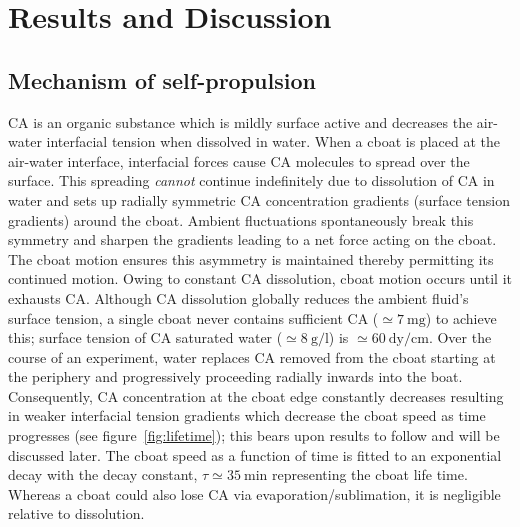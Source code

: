 \documentclass[journal=langd5, manuscript=article, layout=twocolumn]{achemso}
\begin{document}
\section{Results and Discussion}
\subsection{Mechanism of self-propulsion}
\label{sec:propmech}
CA is an organic substance which is mildly surface active and decreases the air-water interfacial tension when dissolved in water. When a cboat is placed at the air-water interface, interfacial forces cause CA molecules to spread over the surface. This spreading \emph{cannot} continue indefinitely due to dissolution of CA in water and sets up radially symmetric CA concentration gradients (surface tension gradients) around the cboat. Ambient fluctuations spontaneously break this symmetry and sharpen the gradients leading to a net force acting on the cboat. The cboat motion ensures this asymmetry is maintained thereby permitting its continued motion. %
Owing to constant CA dissolution, cboat motion occurs until it exhausts CA. Although CA dissolution globally reduces the ambient fluid's surface tension, a single cboat never contains sufficient CA ($\simeq 7\ \mathrm{mg}$) to achieve this; surface tension of CA saturated water ($\simeq 8\ \mathrm{g/l}$) is $\simeq 60\ \mathrm{dy/cm}$. Over the course of an experiment, water replaces CA removed from the cboat starting at the periphery and progressively proceeding radially inwards into the boat. Consequently, CA concentration at the cboat edge constantly decreases resulting in weaker interfacial tension gradients which decrease the cboat speed as time progresses (see figure~\ref{fig:lifetime}); this bears upon results to follow and will be discussed later. The cboat speed as a function of time is fitted to an exponential decay with the decay constant, $\tau \simeq 35\ \mathrm{min}$ representing the cboat life time. Whereas a cboat could also lose CA via evaporation/sublimation, it is negligible relative to dissolution.
\end{document}
